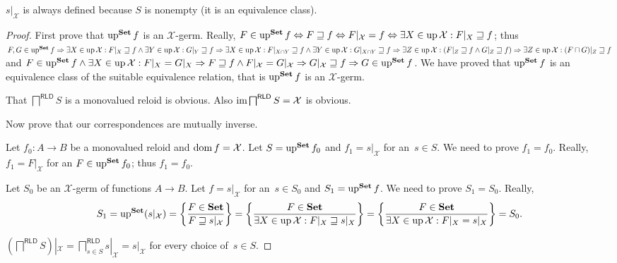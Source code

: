 \begin{rem}
$s|_{\mathcal{X}}$ is always defined because $S$ is nonempty (it is an equivalence class).
\end{rem}

\begin{proof}
  First prove that $\operatorname{up}^{\mathbf{Set}} f$ is an
  $\mathcal{X}$-germ. Really, $F \in \operatorname{up}^{\mathbf{Set}} f
  \Leftrightarrow F \sqsupseteq f \Leftrightarrow F|_{\mathcal{X}} = f
  \Leftrightarrow \exists X \in \operatorname{up} \mathcal{X} : F|_X \sqsupseteq f$;
  thus $F, G \in \operatorname{up}^{\mathbf{Set}} f \Rightarrow \exists X \in
  \operatorname{up} \mathcal{X} : F|_X \sqsupseteq f \wedge \exists Y \in \operatorname{up}
  \mathcal{X} : G|_Y \sqsupseteq f \Rightarrow \exists X \in \operatorname{up}
  \mathcal{X} : F|_{X \cap Y} \sqsupseteq f \wedge \exists Y \in \operatorname{up}
  \mathcal{X} : G|_{X \cap Y} \sqsupseteq f \Rightarrow \exists Z \in
  \operatorname{up} \mathcal{X} : (F|_Z \sqsupseteq f \wedge G|_Z \sqsupseteq f)
  \Rightarrow \exists Z \in \operatorname{up} \mathcal{X} : (F \sqcap G) |_Z
  \sqsupseteq f$ and $F \in \operatorname{up}^{\mathbf{Set}} f \wedge \exists
  X \in \operatorname{up} \mathcal{X} : F|_X = G|_X \Rightarrow F \sqsupseteq f \wedge
  F|_{\mathcal{X}} = G|_{\mathcal{X}} \Rightarrow G|_{\mathcal{X}} \sqsupseteq
  f \Rightarrow G \in \operatorname{up}^{\mathbf{Set}} f$. We have proved
  that $\operatorname{up}^{\mathbf{Set}} f$ is an equivalence class of the
  suitable equivalence relation, that is $\operatorname{up}^{\mathbf{Set}} f$
  is an $\mathcal{X}$-germ.
  
  That $\bigsqcap^{\mathsf{RLD}} S$ is a monovalued reloid is obvious.
  Also $\operatorname{im} \bigsqcap^{\mathsf{RLD}} S = \mathcal{X}$ is obvious.

  Now prove that our correspondences are mutually inverse.

  Let $f_0 : A \rightarrow B$ be a monovalued reloid and $\operatorname{dom} f =
  \mathcal{X}$. Let $S = \operatorname{up}^{\mathbf{Set}} f_0$ and $f_1 =
  s|_{\mathcal{X}}$ for an~$s\in S$. We need to prove $f_1 = f_0$. Really,
  $f_1 = F|_{\mathcal{X}}$ for an $F\in\operatorname{up}^{\mathbf{Set}}f_0$; thus $f_1=f_0$.
  
  Let $S_0$ be an $\mathcal{X}$-germ of functions $A \rightarrow B$. Let $f =
  s|_{\mathcal{X}}$ for an~$s\in S_0$ and $S_1 =
  \operatorname{up}^{\mathbf{Set}} f$. We need to prove $S_1 = S_0$. Really,
  \[
  S_1 = \operatorname{up}^{\mathbf{Set}}(s|_{\mathcal{X}}) =
  \left\{ \frac{F\in\mathbf{Set}}{F\sqsupseteq s|_{\mathcal{X}}}\right\} =
  \left\{ \frac{F\in\mathbf{Set}}{\exists X\in\operatorname{up}\mathcal{X}:F|_X\sqsupseteq s|_X}\right\} =
  \left\{ \frac{F\in\mathbf{Set}}{\exists X\in\operatorname{up}\mathcal{X}:F|_X=s|_X}\right\} = S_0.
  \]
  
  $\left(\bigsqcap^{\mathsf{RLD}} S\right)|_{\mathcal{X}} =
  \bigsqcap^{\mathsf{RLD}}_{s\in S} s|_{\mathcal{X}} = s|_{\mathcal{X}}$
  for every choice of~$s\in S$.


\end{proof}
